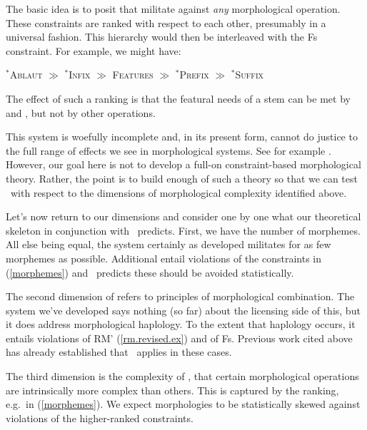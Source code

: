 \documentclass[output=paper,
modfonts
]{LSP/langsci}
\begin{document}
\noindent The basic idea is to posit  that militate against \emph{any} morphological operation. These constraints are ranked with respect to each other, presumably in a universal fashion. This hierarchy would then be interleaved with the Fs constraint. For example, we might have:

\ea
${}^*$\textsc{Ablaut} $\gg$
${}^*$\textsc{Infix} $\gg$
\textsc{Features} $\gg$
${}^*$\textsc{Prefix} $\gg$
${}^*$\textsc{Suffix}
\z

\noindent The effect of such a ranking is that the featural needs of a stem can be met by  and , but not by other operations.

This system is woefully incomplete and, in its present form, cannot do justice to the full range of effects we see in morphological systems. See\add{,} for example\add{,} \cite{where,amorphous}.  However, our goal here is not to develop a full-on constraint-based morphological theory. Rather, the point is to build enough of such a theory so that we can test \io\ with respect to the dimensions of morphological complexity identified above.

Let's now return to our dimensions and consider one by one what our theoretical skeleton in conjunction with \io\ predicts. First, we have the number of morphemes. All else being equal, the system certainly as developed militates for as few morphemes as possible. Additional   entail violations of the constraints in (\ref{morphemes}) and \io\ predicts these should be avoided statistically.

The second dimension of  refers to principles of morphological combination. The system we've developed says nothing (so far) about the licensing side of this, but it does address morphological haplology. To the extent that haplology occurs, it entails violations of RM' (\ref{rm.revised.ex}) and of Fs. Previous work cited above has already established that \io\ applies in these cases.

The third dimension is the complexity of , that certain morphological operations are intrinsically more complex than others. This is captured by the ranking, e.g.\ in (\ref{morphemes}). We expect morphologies to be statistically skewed against violations of the higher-ranked constraints.
\end{document}
